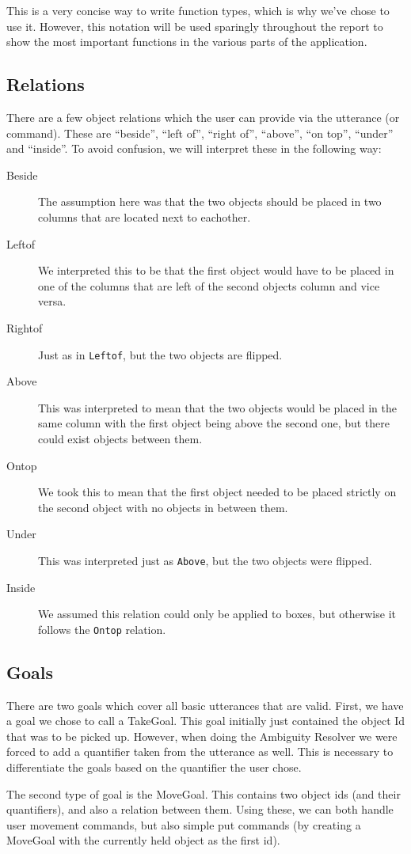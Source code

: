 This is a very concise way to write function types, which is why we've chose to use it. However, this notation will be used sparingly throughout the report to show the most important functions in the various parts of the application.

\subsection*{Relations}
There are a few object relations which the user can provide via the utterance (or command). These are ``beside'', ``left of'', ``right of'', ``above'', ``on top'', ``under'' and ``inside''. To avoid confusion, we will interpret these in the following way:

\begin{description}
  \item[Beside] The assumption here was that the two objects should be placed in
    two columns that are located next to eachother.
  \item[Leftof] We interpreted this to be that the first object would have to be
    placed in one of the columns that are left of the second objects column and
    vice versa.
  \item[Rightof] Just as in \verb|Leftof|, but the two objects are flipped.
  \item[Above] This was interpreted to mean that the two objects would be placed
    in the same column with the first object being above the second one, but
    there could exist objects between them.
  \item[Ontop] We took this to mean that the first object needed to be placed
   strictly on the second object with no objects in between them.
  \item[Under] This was interpreted just as \verb|Above|, but the two objects
    were flipped.
  \item[Inside] We assumed this relation could only be applied to boxes, but
  otherwise it follows the \verb|Ontop| relation.
\end{description}

\subsection*{Goals}
There are two goals which cover all basic utterances that are valid. First, we have a goal we chose to call a TakeGoal. This goal initially just contained the object Id that was to be picked up. However, when doing the Ambiguity Resolver we were forced to add a quantifier taken from the utterance as well. This is necessary to differentiate the goals based on the quantifier the user chose.

The second type of goal is the MoveGoal. This contains two object ids (and their quantifiers), and also a relation between them. Using these, we can both handle user movement commands, but also simple put commands (by creating a MoveGoal with the currently held object as the first id).
